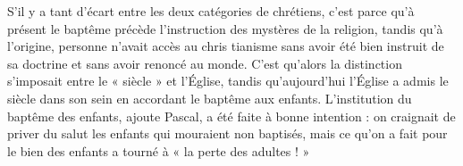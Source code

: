 \documentclass[12pt,a4paper]{article}
\newcommand{\opage}[1]{\marginnote{\footnotesize\textit{[#1]}}}
\begin{document}
S'il y a tant d'écart entre les deux catégories de chrétiens, c'est
parce qu'à présent le baptême précède l'instruction des mystères de
\opage{238} la religion, tandis qu'à l'origine, personne n'avait accès au chris\-%
tianisme sans avoir été bien instruit de sa doctrine et sans avoir
renoncé au monde. C'est qu'alors la distinction s'imposait entre le
« siècle » et l'Église, tandis qu'aujourd'hui l'Église a admis le siècle
dans son sein en accordant le baptême aux enfants. L'institution du
baptême des enfants, ajoute Pascal, a été faite à bonne intention :
on craignait de priver du salut les enfants qui mouraient non baptisés,
mais ce qu'on a fait pour le bien des enfants a tourné à « la perte des
adultes ! »
\end{document}
